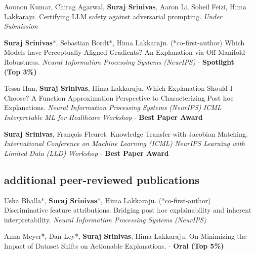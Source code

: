 \documentclass[11pt, a4paper, english]{moderncv}        %
\newcommand{\cvsubsection}[1]{\vspace{0.3cm}\subsection{\large{{#1}}}}
\begin{document}
 {Aounon Kumar, Chirag Agarwal, \textbf{Suraj Srinivas}, Aaron Li, Soheil Feizi, Hima Lakkaraju. \newline Certifying LLM safety against adversarial prompting. 
\newline \textit{Under Submission}}

\vspace*{0.25em}

 {\textbf{Suraj Srinivas}*, Sebastian Bordt*, Hima Lakkaraju. (*co-first-author) \newline Which Models have Perceptually-Aligned Gradients? An Explanation via Off-Manifold Robustness.
\newline \textit{Neural Information Processing Systems (NeurIPS)} - \textbf{Spotlight (Top 3\%)}}
\vspace*{0.25em}

 {Tessa Han, \textbf{Suraj Srinivas}, Hima Lakkaraju. 
\newline Which Explanation Should I Choose? A Function Approximation Perspective to Characterizing Post hoc Explanations.
\newline \textit{Neural Information Processing Systems (NeurIPS)} \newline \textit{ICML Interpretable ML for Healthcare Workshop} - \textbf{Best Paper Award}}
\vspace*{0.25em}

 {\textbf{Suraj Srinivas}, Fran\c{c}ois Fleuret.
\newline Knowledge Transfer with Jacobian Matching.
\newline \textit{International Conference on Machine Learning (ICML)}
\newline \textit{NeurIPS Learning with Limited Data (LLD) Workshop} - \textbf{Best Paper Award}
}
\vspace*{0.25em}

\cvsubsection{additional peer-reviewed publications}
 {Usha Bhalla*, \textbf{Suraj Srinivas}*, Hima Lakkaraju. (*co-first-author) \newline Discriminative feature attributions: Bridging post hoc explainability and inherent interpretability.
\newline \textit{Neural Information Processing Systems (NeurIPS)}}
\vspace*{0.25em}

 {Anna Meyer*, Dan Ley*, \textbf{Suraj Srinivas}, Hima Lakkaraju. \newline On Minimizing the Impact of Dataset Shifts on Actionable Explanations.  - \textbf{Oral (Top 5\%)}
}
\vspace*{0.25em}
\end{document}
